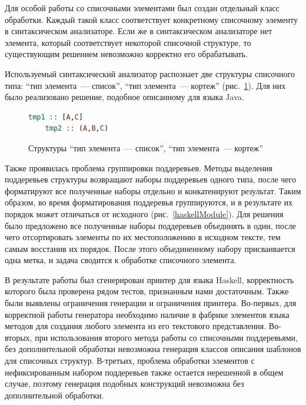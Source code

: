 Для особой работы со списочными элементами был создан отдельный класс обработки. Каждый такой класс соответствует конкретному списочному элементу в синтаксическом анализаторе. Если же в синтаксическом анализаторе нет элемента, который соответствует некоторой списочной структуре, то существующим решением невозможно корректно его обрабатывать. 

Используемый синтаксический анализатор распознает две структуры списочного типа: ``тип элемента~--- список'', ``тип элемента~--- кортеж'' (рис.~\ref{haskellTypes}). Для них было реализовано решение, подобное описанному для языка Java.

\begin{figure}[H]
    \begin{lstlisting}[language=Haskell]
    tmp1 :: [A,C]
    tmp2 :: (A,B,C)
    \end{lstlisting}
\caption{Структуры ``тип элемента~--- список'', ``тип элемента~--- кортеж''}   
\label{haskellTypes}
\end{figure}

Также проявилась проблема группировки поддеревьев. Методы выделения поддеревьев структуры возвращают наборы поддеревьев одного типа, после чего форматируют все полученные наборы отдельно и конкатенируют результат. Таким образом, во время форматирования поддеревья группируются, и в результате их порядок может отличаться от исходного (рис.~\ref{haskellModule}). Для решения было предложено все полученные наборы поддеревьев объединять в один, после чего отсортировать элементы по их местоположению в исходном тексте, тем самым восстанив их порядок. После этого объединенному набору присваивается одна метка, и задача сводится к обработке списочного элемента. 

В результате работы был сгенерирован принтер для языка Haskell, корректность которого была проверена рядом тестов, признанным нами достаточным. Также были выявлены ограничения генерации и ограничения принтера. Во-первых, для корректной работы генератора необходимо наличие в фабрике элементов языка методов для создания любого элемента из его текстового представления. Во-вторых, при использования второго метода работы со списочными поддеревьями, без дополнительной обработки невозможна генерация классов описания шаблонов для списочных структур. В-третьих, проблема обработки элементов с нефиксированным набором поддеревьев также остается нерешенной в общем случае, поэтому генерация подобных конструкций невозможна без дополнительной обработки.

